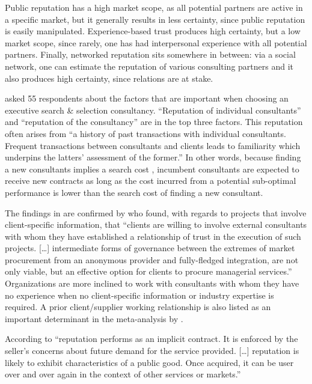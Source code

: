 \documentclass[12pt]{article}
\begin{document}
Public reputation has a high market scope, as all potential partners are
active in a specific market, but it generally results in less certainty,
since public reputation is easily manipulated. Experience-based trust
produces high certainty, but a low market scope, since rarely, one has
had interpersonal experience with all potential partners. Finally,
networked reputation sits somewhere in between: via a social network,
one can estimate the reputation of various consulting partners and it
also produces high certainty, since relations are at stake.

\citet[243-244]{clark1993} asked 55 respondents about the factors that
are important when choosing an executive search \& selection
consultancy. ``Reputation of individual consultants'' and ``reputation
of the consultancy'' are in the top three factors. This reputation often
arises from ``a history of past transactions with individual
consultants. Frequent transactions between consultants and clients leads
to familiarity which underpins the latters' assessment of the former.''
In other words, because finding a new consultants implies a search cost
\citep[ 1072]{wilson2012}, incumbent consultants are expected to receive
new contracts as long as the cost incurred from a potential sub-optimal
performance is lower than the search cost of finding a new consultant.

The findings in \citet{clark1993} are confirmed by
\citet[285]{richter2009} who found, with regards to projects that
involve client-specific information, that ``clients are willing to
involve external consultants with whom they have established a
relationship of trust in the execution of such projects. {[}\ldots{]}
intermediate forms of governance between the extremes of market
procurement from an anonymous provider and fully-fledged integration,
are not only viable, but an effective option for clients to procure
managerial services.'' Organizations are more inclined to work with
consultants with whom they have no experience when no client-specific
information or industry expertise is required. A prior client/supplier
working relationship is also listed as an important determinant in the
meta-analysis by \citet[235]{lacity2011}.

According to \citet[516]{nayyar1990} ``reputation performs as an
implicit contract. It is enforced by the seller's concerns about future
demand for the service provided. {[}\ldots{]} reputation is likely to
exhibit characteristics of a public good. Once acquired, it can be user
over and over again in the context of other services or markets.''
\end{document}
